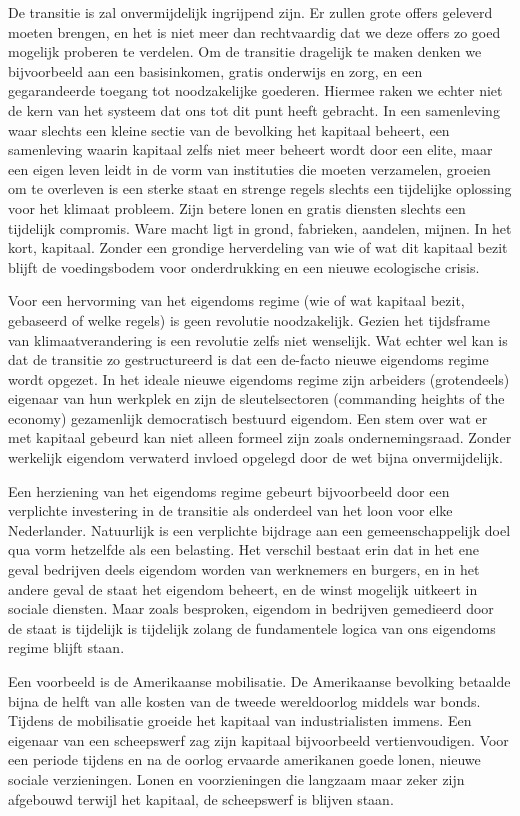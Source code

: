 De transitie is zal onvermijdelijk ingrijpend zijn. Er zullen grote offers geleverd moeten brengen, en het is niet meer dan rechtvaardig dat we deze offers zo goed mogelijk proberen te verdelen. Om de transitie dragelijk te maken denken we bijvoorbeeld aan een basisinkomen, gratis onderwijs en zorg, en een gegarandeerde toegang tot noodzakelijke goederen. Hiermee raken we echter niet de kern van het systeem dat ons tot dit punt heeft gebracht. In een samenleving waar slechts een kleine sectie van de bevolking het kapitaal beheert, een samenleving waarin kapitaal zelfs niet meer beheert wordt door een elite, maar een eigen leven leidt in de vorm van instituties die moeten verzamelen, groeien om te overleven is een sterke staat en strenge regels slechts een tijdelijke oplossing voor het klimaat probleem. Zijn betere lonen en gratis diensten slechts een tijdelijk compromis. 
Ware macht ligt in grond, fabrieken, aandelen, mijnen. In het kort, kapitaal. Zonder een grondige herverdeling van wie of wat dit kapitaal bezit blijft de voedingsbodem voor onderdrukking en een nieuwe ecologische crisis.

Voor een hervorming van het eigendoms regime (wie of wat kapitaal bezit, gebaseerd of welke regels) is geen revolutie noodzakelijk. Gezien het tijdsframe van klimaatverandering is een revolutie zelfs niet wenselijk. Wat echter wel kan is dat de transitie zo gestructureerd is dat een de-facto nieuwe eigendoms regime wordt opgezet. In het ideale nieuwe eigendoms regime zijn arbeiders (grotendeels) eigenaar van hun werkplek en zijn de sleutelsectoren (commanding heights of the economy) gezamenlijk democratisch bestuurd eigendom. Een stem over wat er met kapitaal gebeurd kan niet alleen formeel zijn zoals ondernemingsraad. Zonder werkelijk eigendom verwaterd invloed opgelegd door de wet bijna onvermijdelijk. 

Een herziening van het eigendoms regime gebeurt bijvoorbeeld door een verplichte investering in de transitie als onderdeel van het loon voor elke Nederlander. Natuurlijk is een verplichte bijdrage aan een gemeenschappelijk doel qua vorm hetzelfde als een belasting. Het verschil bestaat erin dat in het ene geval bedrijven deels eigendom worden van werknemers en burgers, en in het andere geval de staat het eigendom beheert, en de winst mogelijk uitkeert in sociale diensten. Maar zoals besproken, eigendom in bedrijven gemedieerd door de staat is tijdelijk is tijdelijk zolang de fundamentele logica van ons eigendoms regime blijft staan. 

Een voorbeeld is de Amerikaanse mobilisatie. De Amerikaanse bevolking betaalde bijna de helft van alle kosten van de tweede wereldoorlog middels war bonds. Tijdens de mobilisatie groeide het kapitaal van industrialisten immens. Een eigenaar van een scheepswerf zag zijn kapitaal bijvoorbeeld vertienvoudigen. Voor een periode tijdens en na de oorlog ervaarde amerikanen goede lonen, nieuwe sociale verzieningen. Lonen en voorzieningen die langzaam maar zeker zijn afgebouwd terwijl het kapitaal, de scheepswerf is blijven staan. 

